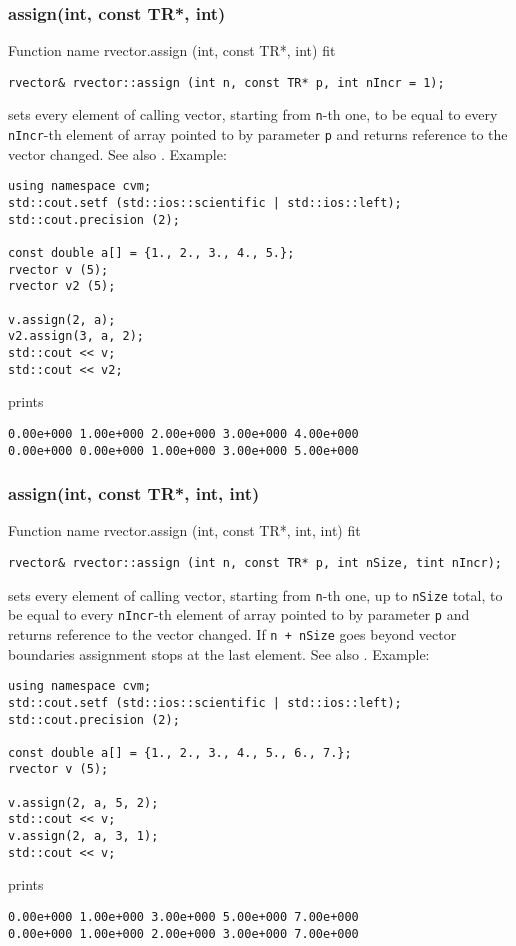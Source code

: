 \subsubsection{assign(int, const TR*, int)}
Function%
\pdfdest name {rvector.assign (int, const TR*, int)} fit
\begin{verbatim}
rvector& rvector::assign (int n, const TR* p, int nIncr = 1);
\end{verbatim}
sets every element of calling vector, starting from \Based \verb"n"-th one,
to be equal to
every \verb"nIncr"-th element of  array pointed to by parameter \verb"p"
and returns  reference to the vector changed.
See also .
Example:
\begin{Verbatim}
using namespace cvm;
std::cout.setf (std::ios::scientific | std::ios::left);
std::cout.precision (2);

const double a[] = {1., 2., 3., 4., 5.};
rvector v (5);
rvector v2 (5);

v.assign(2, a);
v2.assign(3, a, 2);
std::cout << v;
std::cout << v2;
\end{Verbatim}
prints
\begin{Verbatim}
0.00e+000 1.00e+000 2.00e+000 3.00e+000 4.00e+000
0.00e+000 0.00e+000 1.00e+000 3.00e+000 5.00e+000
\end{Verbatim}
\newpage


\subsubsection{assign(int, const TR*, int, int)}
Function%
\pdfdest name {rvector.assign (int, const TR*, int, int)} fit
\begin{verbatim}
rvector& rvector::assign (int n, const TR* p, int nSize, tint nIncr);
\end{verbatim}
sets every element of calling vector, starting from \Based \verb"n"-th one,
up to \verb"nSize" total,
to be equal to
every \verb"nIncr"-th element of  array pointed to by parameter \verb"p"
and returns  reference to the vector changed.
If \verb"n + nSize" goes beyond vector boundaries assignment stops at the last element.
See also .
Example:
\begin{Verbatim}
using namespace cvm;
std::cout.setf (std::ios::scientific | std::ios::left);
std::cout.precision (2);

const double a[] = {1., 2., 3., 4., 5., 6., 7.};
rvector v (5);

v.assign(2, a, 5, 2);
std::cout << v;
v.assign(2, a, 3, 1);
std::cout << v;
\end{Verbatim}
prints
\begin{Verbatim}
0.00e+000 1.00e+000 3.00e+000 5.00e+000 7.00e+000
0.00e+000 1.00e+000 2.00e+000 3.00e+000 7.00e+000
\end{Verbatim}
\newpage





